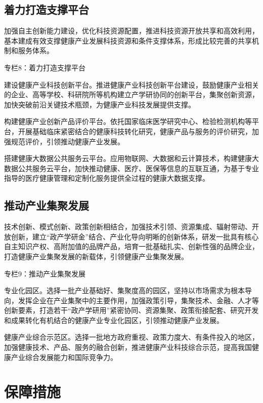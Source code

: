 \documentclass{article}
\begin{document}
\subsection{着力打造支撑平台}
加强自主创新能力建设，优化科技资源配置，推进科技资源开放共享和高效利用，基本建成有效支撑健康产业发展科技资源和条件支撑体系，形成比较完善的共享机制和服务体系。

\begin{minipage}{20em}
专栏8：着力打造支撑平台

建设健康产业科技创新平台。推进健康产业科技创新平台建设，鼓励健康产业相关的企业、高等学校、科研院所等机构建立产学研协同的创新平台，集聚创新资源，加快突破前沿关键技术瓶颈，为健康产业科技发展提供支撑。

构建健康产业创新产品评价平台。依托国家临床医学研究中心、检验检测机构等平台，开展基础临床紧密结合的健康科技转化研究，健康产品与服务的评价研究，加强规范评价，引领推动健康产业发展。

搭建健康大数据公共服务云平台。应用物联网、大数据和云计算技术，构建健康大数据公共服务云平台，加快推动健康、医疗、医保等信息的互联互通，为基于专业指导的医疗健康管理和定制化服务提供全过程的健康大数据支撑。
\end{minipage}

\subsection{推动产业集聚发展}

技术创新、模式创新、政策创新相结合，加强技术引领、资源集成、辐射带动、开放创新，建立“政产学研金”结合、产业化导向明晰的创新体系，研发一批具有核心自主知识产权、高附加值的品牌产品，培育一批基础扎实、创新性强的品牌企业，打造健康产业集聚发展的新载体，引领健康产业集聚发展。

\begin{minipage}{20em}
专栏9：推动产业集聚发展

专业化园区。选择一批产业基础好、集聚度高的园区，坚持以市场需求为根本导向，发挥企业在产业集聚中的主要作用，加强政策引导，集聚技术、金融、人才等创新要素，打造若干“政产学研用”紧密协同、资源集聚、政策衔接配套、研究开发和成果转化有机结合的健康产业专业化园区，引领推动健康产业发展。

健康产业综合示范区。选择一批地方政府重视、政策力度大、有条件投入的地区，加强健康技术、产品、服务的融合创新，推进健康产业科技综合示范，提高我国健康产业综合发展能力和国际竞争力。
\end{minipage}

\section{保障措施}
\end{document}
